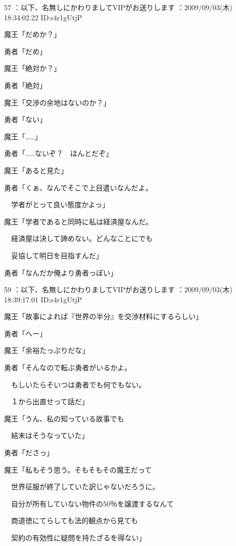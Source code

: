 \documentclass[a4j,twocolumn]{tarticle}
\begin{document}
57 ：以下、名無しにかわりましてVIPがお送りします ：2009/09/03(木) 18:34:02.22 ID:s4r1gUtjP 


魔王「だめか？」\par{} 
勇者「だめ」 



魔王「絶対か？」\par{} 
勇者「絶対」 



魔王「交渉の余地はないのか？」\par{} 
勇者「ない」 



魔王「……」\par{} 
勇者「……ないぞ？　ほんとだぞ」 



魔王「あると見た」 



勇者「くぁ、なんでそこで上目遣いなんだよ。\par{} 
　学者がとって良い態度かよっ」 



魔王「学者であると同時に私は経済屋なんだ。\par{} 
　経済屋は決して諦めない。どんなことにでも \par{}
　妥協して明日を目指すんだ」 



勇者「なんだか俺より勇者っぽい」 

	
    
    

59 ：以下、名無しにかわりましてVIPがお送りします ：2009/09/03(木) 18:39:17.01 ID:s4r1gUtjP 


魔王「故事によれば『世界の半分』を交渉材料にするらしい」\par{} 
勇者「へー」 



魔王「余裕たっぷりだな」 



勇者「そんなので転ぶ勇者がいるかよ。\par{} 
　もしいたらそいつは勇者でも何でもない。\par{} 
　１から出直せって話だ」 



魔王「うん、私の知っている故事でも \par{}
　結末はそうなっていた」\par{} 
勇者「ださっ」 



魔王「私もそう思う。そもそもその魔王だって\par{} 
　世界征服が終了していた訳じゃないだろうに。\par{} 
　自分が所有していない物件の50％を譲渡するなんて\par{} 
　商道徳にてらしても法的観点から見ても\par{} 
　契約の有効性に疑問を持たざるを得ない」 
\end{document}
